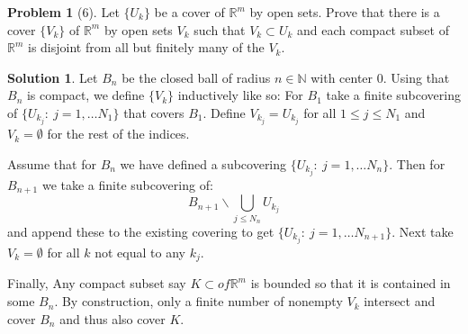 \documentclass{article}
\theoremstyle{definition}
\newtheorem*{soln}{Solution}
\newtheorem*{prob}{Problem}
\theoremstyle{theorem}
\newcommand{\R}{\mathbb{R}}
\newcommand{\N}{\mathbb{N}}
\newcommand{\E}{\mathbb{\emptyset}}
\begin{document}
\begin{prob}[6]
    Let $\{U_k  \}$ be a cover of $\R^m$ by open sets. Prove that there is a cover $\{V_k  \}$ of $\R^m$ by open sets $V_k$ such that $V_k \subset U_k$ and each compact subset of $\R^m$ is disjoint from all but finitely many of the $V_k$.
\end{prob}
\begin{soln}
    Let $B_n$ be the closed ball of radius $n\in \N$ with center 0. Using that $B_n$ is compact, we define $\{V_k  \}$ inductively like so: For $B_1$ take a finite subcovering of $\{U_{k_j } :\ j=1,\ldots N_1 \}$ that covers $B_1$. Define $V_{k_j }=U_{k_j }$ for all $1\leq j \leq N_1$ and $V_k = \E$ for the rest of the indices.

    Assume that for $B_n$ we have defined a subcovering $\{U_{k_j } :\ j=1,\ldots N_n \}$. Then for $B_{n+1 }$  we take a finite subcovering of:
     $$B_{n+1 }\backslash \bigcup_{j\leq N_n }U_{k_j }$$
     and append these to the existing covering to get $\{U_{k_j } :\ j=1,\ldots N_{n+1 } \}$. Next take $V_k=\E$ for all $k$ not equal to any $k_j$.

     Finally, Any compact subset say $K\subset of \R^m$ is bounded so that it is contained in some $B_n$. By construction, only a finite number of nonempty $V_k$ intersect  and cover $B_n$ and thus also cover $K$.
\end{soln}
\vspace{1in}
\end{document}
